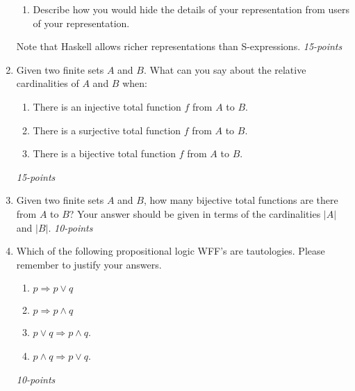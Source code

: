 \documentclass[12pt]{article}
\begin{document}
\begin{enumerate}
\begin{enumerate}
  \item Describe how you would hide the details of your representation from
    users of your representation.

\end{enumerate}

Note that Haskell allows richer representations than S-expressions.
\hfill\textit{15-points}
  
  

\item Given two finite sets $A$ and $B$.  What can you say
  about the relative cardinalities of $A$ and $B$ when:

  \begin{enumerate}

  \item There is an injective total function $f$ from $A$ to $B$.

  \item There is a surjective total function  $f$ 
     from $A$ to $B$.

   \item There is a bijective total function  $f$ from $A$ to $B$.

  \end{enumerate}     \hfill\textit{15-points}



\item Given two finite sets $A$ and $B$, how many bijective total
  functions are there from $A$ to $B$?  Your answer should be given in
  terms of the cardinalities $|A|$ and $|B|$. \hfill\textit{10-points}


\item Which of the following propositional logic WFF's are tautologies.
  Please remember to justify your answers.

\begin{enumerate}

  \item $p \Rightarrow p \vee q$

  \item $p \Rightarrow p \wedge q$

  \item $p \vee q \Rightarrow p \wedge q$.

  \item $p \wedge q \Rightarrow p \vee q$.    
    

\end{enumerate} \hfill\textit{10-points}

  


\end{enumerate}
\end{document}
